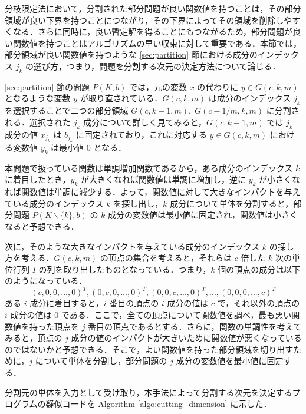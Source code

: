 \documentclass[a4paper,11pt]{jreport}
\begin{document}
分枝限定法において，分割された部分問題が良い関数値を持つことは，その部分領域が良い下界を持つことにつながり，その下界によってその領域を削除しやすくなる．さらに同時に，良い暫定解を得ることにもつながるため，部分問題が良い関数値を持つことはアルゴリズムの早い収束に対して重要である．本節では，部分領域が良い関数値を持つような \ref{sec:partition} 節における成分のインデックス $ j_k $ の選び方，つまり，問題を分割する次元の決定方法について論じる．\par
\ref{sec:partition} 節の問題 $ P(K, b) $ では，元の変数 $ x $ の代わりに $ y \in G(c, k, m) $ となるような変数 $ y $ が取り直されている．$ G(c, k, m) $ は成分のインデックス $ j_k $ を選択することで二つの部分領域 $ G(c, k-1, m), \; G(c-1/m, k, m) $ に分割される．選択された $ j_k $ 成分について詳しく見てみると，$ G(c, k - 1, m) $ では $ j_k $ 成分の値 $ x_{j_k} $ は $ b_{j_k} $ に固定されており，これに対応する $ y \in G(c, k, m) $ における変数値 $ y_k $ は最小値 $ 0 $ となる．\par
本問題で扱っている関数は単調増加関数であるから，ある成分のインデックス $ k $ に着目したとき，$ y_k $ が大きくなれば関数値は単調に増加し，逆に $ y_k $ が小さくなれば関数値は単調に減少する．よって，関数値に対して大きなインパクトを与えている成分のインデックス $ k $ を探し出し，$ k $ 成分について単体を分割すると，部分問題 $ P(K \backslash \{ k \}, b) $ の $ k $ 成分の変数値は最小値に固定され，関数値は小さくなると予想できる．\par
次に，そのような大きなインパクトを与えている成分のインデックス $ k $ の探し方を考える．$ G(c, k, m) $ の頂点の集合を考えると，それらは $ c $ 倍した $ k $ 次の単位行列 $ I $ の列を取り出したものとなっている．つまり，$ k $ 個の頂点の成分は以下のようになっている．
$$ (c, 0, 0, ..., 0)^T, (0, c, 0, ..., 0)^T, (0, 0, c, ..., 0)^T, ..., (0, 0, 0, ..., c)^T $$
ある $ i $ 成分に着目すると，$ i $ 番目の頂点の $ i $ 成分の値は $ c $ で，それ以外の頂点の $ i $ 成分の値は $ 0 $ である．ここで，全ての頂点について関数値を調べ，最も悪い関数値を持った頂点を $ j $ 番目の頂点であるとする．さらに，関数の単調性を考えてみると，頂点の $ j $ 成分の値のインパクトが大きいために関数値が悪くなっているのではないかと予想できる．そこで，よい関数値を持った部分領域を切り出すために，$ j $ について単体を分割し，部分問題の $ j $ 成分の変数値を最小値に固定する．\par
分割元の単体を入力として受け取り，本手法によって分割する次元を決定するプログラムの疑似コードを Algorithm \ref{algo:cutting_dimension} に示した．\par
\end{document}
